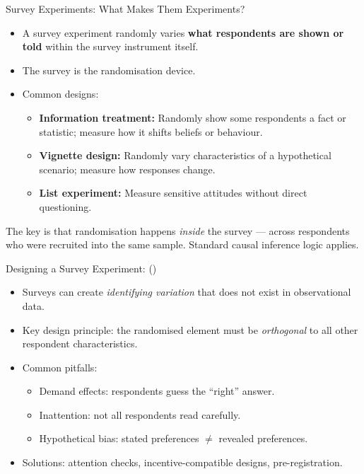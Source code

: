 \documentclass[aspectratio=169, 11pt]{beamer}
\begin{document}
\begin{frame}[t]{Survey Experiments: What Makes Them Experiments?}
\begin{itemize}
  \setlength\itemsep{0.5em}
  \item A survey experiment randomly varies \textbf{what respondents are shown or told}
        within the survey instrument itself.
  \item The survey is the randomisation device.
  \item Common designs:
    \begin{itemize}
      \item \textbf{Information treatment:} Randomly show some respondents a fact or statistic;
            measure how it shifts beliefs or behaviour.
      \item \textbf{Vignette design:} Randomly vary characteristics of a hypothetical
            scenario; measure how responses change.
      \item \textbf{List experiment:} Measure sensitive attitudes without direct questioning.
    \end{itemize}
\end{itemize}
\vspace{0.3em}
\begin{intuitionbox}
The key is that randomisation happens \emph{inside} the survey — across respondents
who were recruited into the same sample. Standard causal inference logic applies.
\end{intuitionbox}
\end{frame}

\begin{frame}[t]{Designing a Survey Experiment: \citeauthor{Stantcheva2023_surveys} (\citeyear{Stantcheva2023_surveys})}
\begin{examplebox}
  \small
  \begin{itemize}
    \item Surveys can create \emph{identifying variation} that does not exist in observational data.
    \item Key design principle: the randomised element must be \emph{orthogonal}
          to all other respondent characteristics.
    \item Common pitfalls:
      \begin{itemize}
        \item Demand effects: respondents guess the ``right'' answer.
        \item Inattention: not all respondents read carefully.
        \item Hypothetical bias: stated preferences $\neq$ revealed preferences.
      \end{itemize}
    \item Solutions: attention checks, incentive-compatible designs, pre-registration.
  \end{itemize}
\end{examplebox}
\end{frame}
\end{document}
